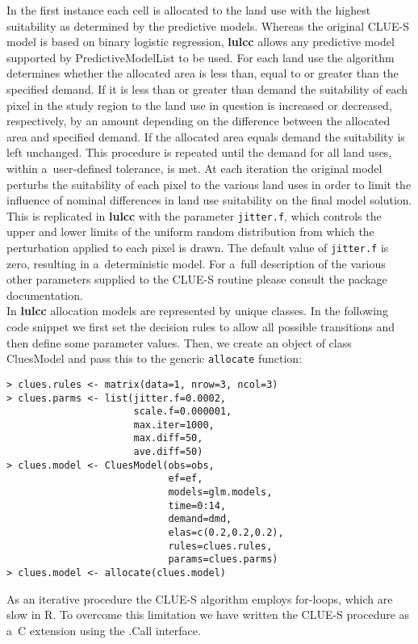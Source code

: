 \documentclass{icldt}\usepackage[]{graphicx}\usepackage[]{color}
\begin{document}
In the first instance each cell is allocated to the land use with the highest suitability as determined by the predictive models. Whereas the original CLUE-S model is based on binary logistic regression, \textbf{lulcc} allows any predictive model supported by PredictiveModelList to be used. For each land use the algorithm determines whether the allocated area is less than, equal to or greater than the specified demand. If it is less than or greater than demand the suitability of each pixel in the study region to the land use in question is increased or decreased, respectively, by an amount depending on the difference between the allocated area and specified demand. If the allocated area equals demand the suitability is left unchanged. This procedure is repeated until the demand for all land uses, within a~user-defined tolerance, is met. At each iteration the original model perturbs the suitability of each pixel to the various land uses in order to limit the influence of nominal differences in land use suitability on the final model solution. This is replicated in \textbf{lulcc} with the parameter \texttt{jitter.f}, which controls the upper and lower limits of the uniform random distribution from which the perturbation applied to each pixel is drawn. The default value of \texttt{jitter.f} is zero, resulting in a~deterministic model. For a~full description of the various other parameters supplied to the CLUE-S routine please consult the package documentation. \\

In \textbf{lulcc} allocation models are represented by unique classes. In the following code snippet we first set the decision rules to allow all possible transitions and then define some parameter values. Then, we create an object of class CluesModel and pass this to the generic \texttt{allocate} function:
\begin{verbatim}
> clues.rules <- matrix(data=1, nrow=3, ncol=3) 
> clues.parms <- list(jitter.f=0.0002, 
                      scale.f=0.000001, 
                      max.iter=1000, 
                      max.diff=50, 
                      ave.diff=50) 
> clues.model <- CluesModel(obs=obs, 
                            ef=ef, 
                            models=glm.models, 
                            time=0:14, 
                            demand=dmd, 
                            elas=c(0.2,0.2,0.2), 
                            rules=clues.rules, 
                            params=clues.parms) 
> clues.model <- allocate(clues.model)
\end{verbatim}
\noindent As an iterative procedure the CLUE-S algorithm employs for-loops, which are slow in R. To overcome this limitation we have written the CLUE-S procedure as a~C extension using the .Call interface. \\
\end{document}
